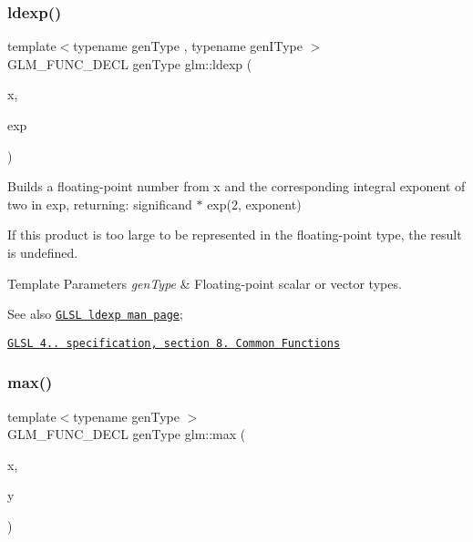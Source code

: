 \subsubsection{\texorpdfstring{ldexp()}{ldexp()}}
{\footnotesize\ttfamily template$<$typename gen\+Type , typename gen\+I\+Type $>$ \\
G\+L\+M\+\_\+\+F\+U\+N\+C\+\_\+\+D\+E\+CL gen\+Type glm\+::ldexp (\begin{DoxyParamCaption}\item[{gen\+Type const \&}]{x,  }\item[{gen\+I\+Type const \&}]{exp }\end{DoxyParamCaption})}

Builds a floating-\/point number from x and the corresponding integral exponent of two in exp, returning\+: significand $\ast$ exp(2, exponent)

If this product is too large to be represented in the floating-\/point type, the result is undefined.


\begin{DoxyTemplParams}{Template Parameters}
{\em gen\+Type} & Floating-\/point scalar or vector types.\\
\hline
\end{DoxyTemplParams}
\begin{DoxySeeAlso}{See also}
\href{http://www.opengl.org/sdk/docs/manglsl/xhtml/ldexp.xml}{\tt G\+L\+SL ldexp man page}; 

\href{http://www.opengl.org/registry/doc/GLSLangSpec.4.20.8.pdf}{\tt G\+L\+SL 4.. specification, section 8. Common Functions} 
\end{DoxySeeAlso}
\mbox{\label{group__core__func__common_ga98caa7f95a94c86a86ebce893a45326c}} 
\subsubsection{\texorpdfstring{max()}{max()}}
{\footnotesize\ttfamily template$<$typename gen\+Type $>$ \\
G\+L\+M\+\_\+\+F\+U\+N\+C\+\_\+\+D\+E\+CL gen\+Type glm\+::max (\begin{DoxyParamCaption}\item[{gen\+Type}]{x,  }\item[{gen\+Type}]{y }\end{DoxyParamCaption})}

